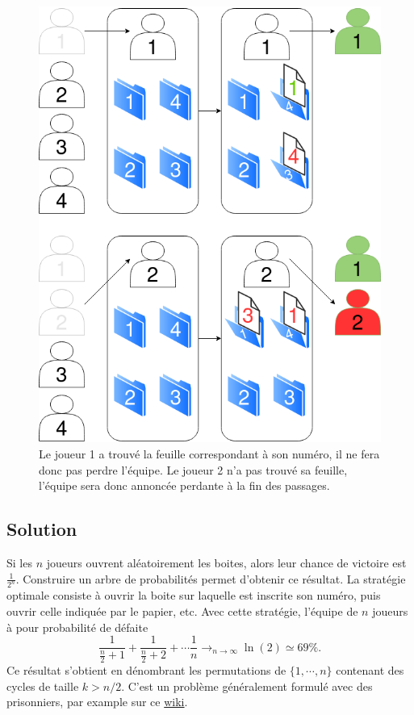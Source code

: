 \documentclass[a4paper,10pt,oneside]{article}
\begin{document}
\begin{figure}[!h]
  \centering
  \includegraphics[height=0.3\textheight]{figures/boites.png}
  \caption{Le joueur 1 a trouvé la feuille correspondant à son numéro, il ne fera donc pas perdre l'équipe. Le joueur 2 n'a pas trouvé sa feuille, l'équipe sera donc annoncée perdante à la fin des passages.}
\end{figure}


\subsection{Solution}

Si les $n$ joueurs ouvrent aléatoirement les boites, alors leur chance de victoire est $\frac{1}{2^n}$. 
Construire un arbre de probabilités permet d'obtenir ce résultat.
La stratégie optimale consiste à ouvrir la boite sur laquelle est inscrite son numéro, puis ouvrir celle indiquée par le papier, etc. 
Avec cette stratégie, l'équipe de $n$ joueurs à pour probabilité de défaite
\[
  \frac{1}{\frac{n}{2} +1} + \frac{1}{\frac{n}{2} + 2} + \cdots \frac{1}{n} 
  \rightarrow_{n\rightarrow \infty} \ln(2) \simeq 69\%.
\]
Ce résultat s'obtient en dénombrant les permutations de $\{1,\cdots,n\}$ contenant des cycles de taille $k > n/2$.
C'est un problème généralement formulé avec des prisonniers, par example sur ce \href{https://en.wikipedia.org/wiki/100_prisoners_problem}{wiki}.


\newpage
  

\end{document}
